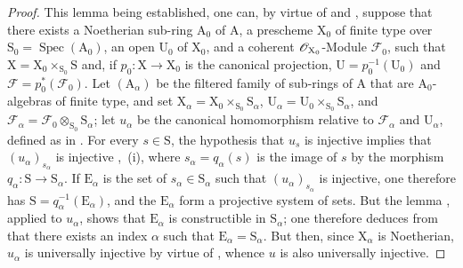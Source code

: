 \begin{proof}
This lemma being established, one can, by virtue of  and , suppose that there exists a Noetherian sub-ring $\mathrm{A}_0$ of $\mathrm{A}$, a prescheme $\mathrm{X}_0$ of finite type over $\mathrm{S}_0=\operatorname{Spec}(\mathrm{A}_0)$, an open $\mathrm{U}_0$ of $\mathrm{X}_0$, and a coherent $\mathscr{O}_{\mathrm{X}_0}$-Module $\mathscr{F}_0$, such that $\mathrm{X}=\mathrm{X}_0\times_{\mathrm{S}_0}\mathrm{S}$ and, if $p_0:\mathrm{X}\to\mathrm{X}_0$ is the canonical projection, $\mathrm{U}=p_0^{-1}(\mathrm{U}_0)$ and $\mathscr{F}=p_0^*(\mathscr{F}_0)$.
Let $(\mathrm{A}_\alpha)$ be the filtered family of sub-rings of $\mathrm{A}$ that are $\mathrm{A}_0$-algebras of finite type, and set $\mathrm{X}_\alpha=\mathrm{X}_0\times_{\mathrm{S}_0}\mathrm{S}_\alpha$, $\mathrm{U}_\alpha=\mathrm{U}_0\times_{\mathrm{S}_0}\mathrm{S}_\alpha$, and $\mathscr{F}_\alpha=\mathscr{F}_0\otimes_{\mathrm{S}_0}\mathrm{S}_\alpha$; let $u_\alpha$ be the canonical homomorphism relative to $\mathscr{F}_\alpha$ and $\mathrm{U}_\alpha$, defined as in .
For every $s\in\mathrm{S}$, the hypothesis that $u_s$ is injective implies that $(u_\alpha)_{s_\alpha}$ is injective ,~(i), where $s_\alpha=q_\alpha(s)$ is the image of $s$ by the morphism $q_\alpha:\mathrm{S}\to\mathrm{S}_\alpha$.
If $\mathrm{E}_\alpha$ is the set of $s_\alpha\in\mathrm{S}_\alpha$ such that $(u_\alpha)_{s_\alpha}$ is injective, one therefore has $\mathrm{S}=q_\alpha^{-1}(\mathrm{E}_\alpha)$, and the $\mathrm{E}_\alpha$ form a projective system of sets.
But the lemma , applied to $u_\alpha$, shows that $\mathrm{E}_\alpha$ is constructible in $\mathrm{S}_\alpha$; one therefore deduces from  that there exists an index $\alpha$ such that $\mathrm{E}_\alpha=\mathrm{S}_\alpha$.
But then, since $\mathrm{X}_\alpha$ is Noetherian, $u_\alpha$ is universally injective by virtue of , whence $u$ is also universally injective.
\medskip


\end{proof}
